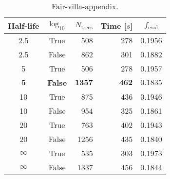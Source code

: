 
\begin{table}[h!]
  \begin{tabular}{@{}ccrrc@{}}
    Half-life & $\log_{10}$ & $N_\mathrm{trees}$ & Time [$s$] & $f_\mathrm{eval}$ \\
    \midrule
    \num{2.5} & True & \num{508} & \num{278} & \num{0.1956} \\
    \num{2.5} & False & \num{862} & \num{301} & \num{0.1882} \\
    \num{5} & True & \num{506} & \num{278} & \num{0.1957} \\
    $\mathbf{5}$ & \textbf{False} & $\mathbf{1357}$ & $\mathbf{462}$ & $\mathbf{0.1835}$ \\
    \num{10} & True & \num{875} & \num{436} & \num{0.1946} \\
    \num{10} & False & \num{954} & \num{325} & \num{0.1861} \\
    \num{20} & True & \num{763} & \num{402} & \num{0.1943} \\
    \num{20} & False & \num{1256} & \num{435} & \num{0.1840} \\
    $\infty$ & True & \num{535} & \num{303} & \num{0.1973} \\
    $\infty$ & False & \num{1337} & \num{456} & \num{0.1844} \\
  \end{tabular}
  \caption{\label{tab:h:HPO_initial_Fair-villa-appendix}Fair-villa-appendix.}
\end{table}
